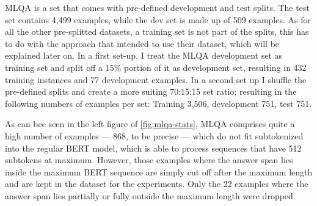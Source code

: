 



MLQA is a set that comes with pre-defined development and test splits. The test set
contains 4,499 examples, while the dev set is made up of 509 examples. As for all the
other pre-splitted datasets, a training set is not part of the splits, this has to do
with the approach that \cite{lewis2019mlqa} intended to use their dataset, which will
be explained later on. In a first set-up, I treat the MLQA development
set as training set and split off a 15\% portion of it as development set, resulting
in 432 training instances and 77 development examples. In a second set up I shuffle
the pre-defined splits and create a more suiting 70:15:15 set ratio; resulting in the
following numbers of examples per set: Training 3,506, development 751, test 751.

As can bee seen in the left figure of \ref{fig:mlqa-stats}, MLQA comprises quite a high number
of examples --- 868, to be precise --- which do not fit subtokenized into the regular BERT
model, which is able to process sequences that have 512 subtokens at maximum. However, those
examples where the answer span lies inside the maximum BERT sequence are simply cut off after
the maximum length and are kept in the dataset for the experiments. Only the 22 examples where
the answer span lies partially or fully outside the maximum length were dropped.





